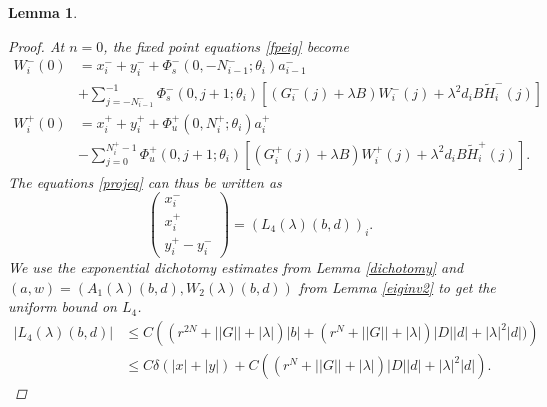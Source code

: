 \documentclass[12pt]{article}
\newtheorem{lemma}{Lemma}
\begin{document}
\begin{lemma}
\begin{proof}
At $n = 0$, the fixed point equations \eqref{fpeig} become 
\begin{align*}
W_i^-(0) &= x_i^- + y_i^- +
\Phi_s^-(0, -N_{i-1}^-; \theta_i) a_{i-1}^- \\
&+ \sum_{j = -N_{i-1}^-}^{-1} \Phi_s^-(0, j+1; \theta_i)
[(G_i^-(j) + \lambda B) W_i^-(j) + \lambda^2 d_i B \tilde{H}_i^-(j)] \\
W_i^+(0) &= x_i^+ + y_i^+ + \Phi_u^+(0, N_i^+; \theta_i) a_i^+ \\
&- \sum_{j = 0}^{N_i^+-1} \Phi_u^+(0, j+1; \theta_i) 
[(G_i^+(j) + \lambda B) W_i^+(j) + \lambda^2 d_i B \tilde{H}_i^+(j)].
\end{align*}
The equations \eqref{projeq} can thus be written as
\begin{equation}\label{projeq2}
\begin{pmatrix}
x_i^- \\ x_i^+ \\ y_i^+ - y_i^-
\end{pmatrix}
= (L_4(\lambda)(b,d))_i.
\end{equation}
We use the exponential dichotomy estimates from Lemma \ref{dichotomy} and $(a, w) = (A_1(\lambda)(b,d), W_2(\lambda)(b,d))$ from Lemma \ref{eiginv2} to get the uniform bound on $L_4$.
\begin{align*}
|L_4(\lambda)(b,d)| 
&\leq C \left( (r^{2N} + ||G|| + |\lambda|)|b| + 
(r^{N} + ||G|| + |\lambda|)|D| |d| + |\lambda|^2 |d| )
\right) \\
&\leq C \delta(|x| + |y|) + C \left( (r^{N} + ||G|| + |\lambda|)|D| |d| + |\lambda|^2 |d| \right).
\end{align*}


\end{proof}
\end{lemma}
\end{document}
